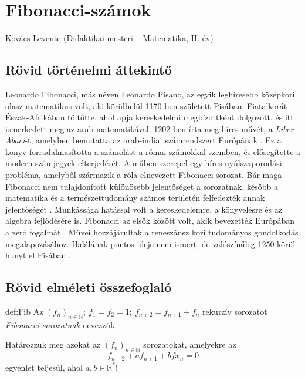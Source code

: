 
\chapter{Fibonacci-számok}\label{chap:Fibonacci}
\begin{description}
{\large \item [{Szerző:}] Kovács Levente (Didaktikai mesteri -- Matematika, II.
év)}
\end{description}

\section*{Rövid történelmi áttekintő}

Leonardo Fibonacci, más néven Leonardo Pisano, az egyik leghíresebb
középkori olasz matematikus volt, aki körülbelül 1170-ben született
Pisában. Fiatalkorát Észak-Afrikában töltötte, ahol apja kereskedelmi
megbízottként dolgozott, és itt ismerkedett meg az arab matematikával.
1202-ben írta meg híres művét, a \textit{Liber Abaci}-t, amelyben
bemutatta az arab-indiai számrendszert Európának \cite{fibonacci2002}.
Ez a könyv forradalmasította a számolást a római számokkal szemben,
és elősegítette a modern számjegyek elterjedését. A műben szerepel
egy híres nyúlszaporodási probléma, amelyből származik a róla elnevezett
Fibonacci-sorozat. Bár maga Fibonacci nem tulajdonított különösebb
jelentőséget a sorozatnak, később a matematika és a természettudomány
számos területén felfedezték annak jelentőségét \cite{devlin2011}.
Munkássága hatással volt a kereskedelemre, a könyvelésre és az algebra
fejlődésére is. Fibonacci az elsők között volt, akik bevezették Európában
a zéró fogalmát \cite{boyer2011}. Művei hozzájárultak a reneszánsz
kori tudományos gondolkodás megalapozásához. Halálának pontos ideje
nem ismert, de valószínűleg 1250 körül hunyt el Pisában \cite{oconnor}.

\section*{Rövid elméleti összefoglaló}
\begin{definition}{def:Fib}
Az $(f_{n})_{n\in\mathbb{N}};\ f_{1}=f_{2}=1;\ f_{n+2}=f_{n+1}+f_{n}$
rekurzív sorozatot \textit{Fibonacci-sorozatnak} nevezzük.
\end{definition}
\begin{problem}
Határozzuk meg azokat az $(f_{n})_{n\in\mathbb{N}}$ sorozatokat,
amelyekre az 
\begin{equation}
f_{n+2}+af_{n+1}+bfx_{n}=0\label{thm1}
\end{equation}
egyenlet teljesül, ahol $a,b\in\mathbb{R}^{*}$! 
\end{problem}

